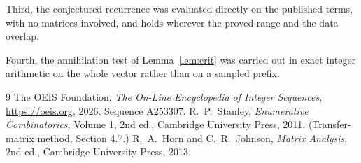 \documentclass[11pt,a4paper]{article}
\theoremstyle{plain}
\theoremstyle{definition}
\begin{document}
Third, the conjectured recurrence was evaluated directly on the published terms, with no
matrices involved, and holds wherever the proved range and the data overlap.

Fourth, the annihilation test of Lemma~\ref{lem:crit} was carried out in exact integer
arithmetic on the whole vector rather than on a sampled prefix.

\begin{thebibliography}{9}
 The OEIS Foundation, \emph{The On-Line Encyclopedia of Integer
Sequences}, \url{https://oeis.org}, 2026. Sequence A253307.
 R.~P.~Stanley, \emph{Enumerative Combinatorics}, Volume 1, 2nd ed.,
Cambridge University Press, 2011. (Transfer-matrix method, Section 4.7.)
 R.~A.~Horn and C.~R.~Johnson, \emph{Matrix Analysis}, 2nd ed., Cambridge
University Press, 2013.
\end{thebibliography}
\end{document}
